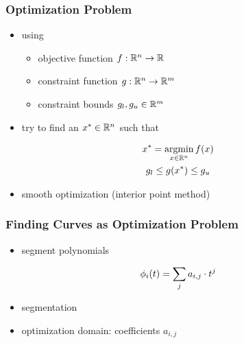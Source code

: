 \documentclass[mathserif]{beamer}
\begin{document}
		\begin{frame}
			\frametitle{Optimization Problem}
			\begin{itemize}
				\item using
				\begin{itemize}
					\item objective function \(f : \mathbb{R}^{n} \rightarrow \mathbb{R}\)
					\item constraint function \(g : \mathbb{R}^{n} \rightarrow \mathbb{R}^{m}\)
					\item constraint bounds \(g_l, g_u \in \mathbb{R}^{m}\)
				\end{itemize} 
				\item try to find an \(x^* \in \mathbb{R}^{n}\) such that 
			\end{itemize}
			\begin{equation*}
				\begin{gathered}
					x^* = \operatorname*{argmin}_{x \in \mathbb{R}^{n}} f\!\left( x \right)\\
					g_l \leq g\!\left( x^* \right) \leq g_u
				\end{gathered}
			\end{equation*}
			\begin{itemize}
				\item smooth optimization (interior point method)
			\end{itemize}
		\end{frame}

		\begin{frame}
			\frametitle{Finding Curves as Optimization Problem}
			\begin{itemize}
				\item segment polynomials
			\end{itemize}
			\begin{equation*}
				\phi_i\!\left( t \right) = \sum_j a_{i,j} \cdot t^j
			\end{equation*}
			\begin{itemize}
				\item segmentation
			\end{itemize}
			\begin{itemize}
				\item optimization domain: coefficients \(a_{i,j}\)
			\end{itemize}
		\end{frame}
\end{document}
